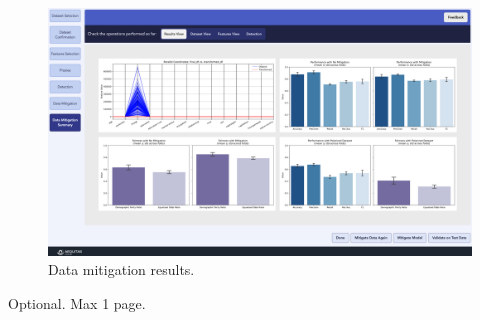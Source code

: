 \documentclass[12pt,a4paper,openright,twoside]{book}
\begin{document}
\begin{figure}
    \centering
    \includegraphics[width=\textwidth]{figures/gui/mitigation-results.png}
    \caption{Data mitigation results.}
    \label{fig:mitigation-results}
\end{figure}



\backmatter





\begin{acknowledgements} %
Optional. Max 1 page.
\end{acknowledgements}
\end{document}
